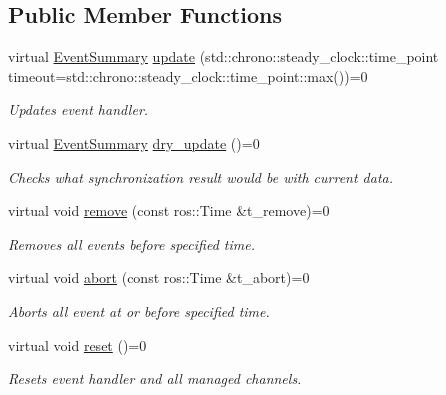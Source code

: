 \subsection*{Public Member Functions}
\begin{DoxyCompactItemize}
\item 
virtual \hyperlink{structflow__ros_1_1_event_summary}{Event\+Summary} \hyperlink{classflow__ros_1_1_event_handler_base_a5a4d9baa42d26f4d639b69ebbcc2aa0a}{update} (std\+::chrono\+::steady\+\_\+clock\+::time\+\_\+point timeout=std\+::chrono\+::steady\+\_\+clock\+::time\+\_\+point\+::max())=0
\begin{DoxyCompactList}\small\item\em Updates event handler. \end{DoxyCompactList}\item 
virtual \hyperlink{structflow__ros_1_1_event_summary}{Event\+Summary} \hyperlink{classflow__ros_1_1_event_handler_base_a85873d1e3eaa3c152295c5c49d5948f6}{dry\+\_\+update} ()=0
\begin{DoxyCompactList}\small\item\em Checks what synchronization result would be with current data. \end{DoxyCompactList}\item 
virtual void \hyperlink{classflow__ros_1_1_event_handler_base_a73c65bda396f3d8606e64487a7b30a76}{remove} (const ros\+::\+Time \&t\+\_\+remove)=0
\begin{DoxyCompactList}\small\item\em Removes all events before specified time. \end{DoxyCompactList}\item 
virtual void \hyperlink{classflow__ros_1_1_event_handler_base_a5611152cffdc62a4215726d19ce58ab5}{abort} (const ros\+::\+Time \&t\+\_\+abort)=0
\begin{DoxyCompactList}\small\item\em Aborts all event at or before specified time. \end{DoxyCompactList}\item 
\mbox{\label{classflow__ros_1_1_event_handler_base_acd6151fd8c25f23c84fc4c815302f584}} 
virtual void \hyperlink{classflow__ros_1_1_event_handler_base_acd6151fd8c25f23c84fc4c815302f584}{reset} ()=0
\begin{DoxyCompactList}\small\item\em Resets event handler and all managed channels. \end{DoxyCompactList}\item 

\end{DoxyCompactItemize}
